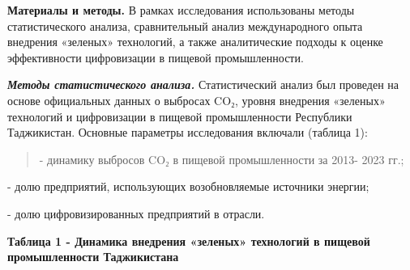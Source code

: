 {\bfseries Материалы и методы.} В рамках исследования использованы методы
статистического анализа, сравнительный анализ международного опыта
внедрения «зеленых» технологий, а также аналитические подходы к оценке
эффективности цифровизации в пищевой промышленности.

\emph{{\bfseries Методы статистического анализа.}} Статистический анализ
был проведен на основе официальных данных о выбросах CO₂, уровня
внедрения «зеленых» технологий и цифровизации в пищевой промышленности
Республики Таджикистан. Основные параметры исследования включали
(таблица 1):

\begin{quote}
- динамику выбросов CO₂ в пищевой промышленности за 2013- 2023 гг.;
\end{quote}

- долю предприятий, использующих возобновляемые источники энергии;

- долю цифровизированных предприятий в отрасли.

{\bfseries Таблица 1 - Динамика внедрения «зеленых» технологий в пищевой
промышленности Таджикистана}


